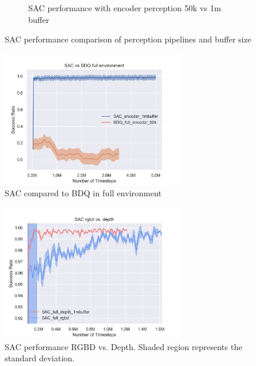 \begin{figure}[!htbp]
\begin{subfigure}{0.49\textwidth}
        \caption{SAC performance with encoder perception 50k vs 1m buffer} \label{fig:encbuffer}
    \end{subfigure}%
    \hspace*{\fill}   %


\caption{ SAC performance comparison of perception pipelines and buffer size\label{fig:sacperf}}
\end{figure}

\begin{figure}[!htbp]
    \centering
        \includegraphics[width=0.7\textwidth]{figures/SACfull/SAC_vs_BDQ_full_environment}
    \caption{SAC compared to BDQ in full environment}
    \label{fig:bdq}
\end{figure}

\begin{figure}[!htbp]
    \centering
        \includegraphics[width=0.7\textwidth]{figures/SACfull/SAC_rgbd_vs_depth}
    \caption{SAC performance RGBD vs. Depth. Shaded region represents the standard deviation.}
    \label{fig:depthvsrgbd}
\end{figure}
